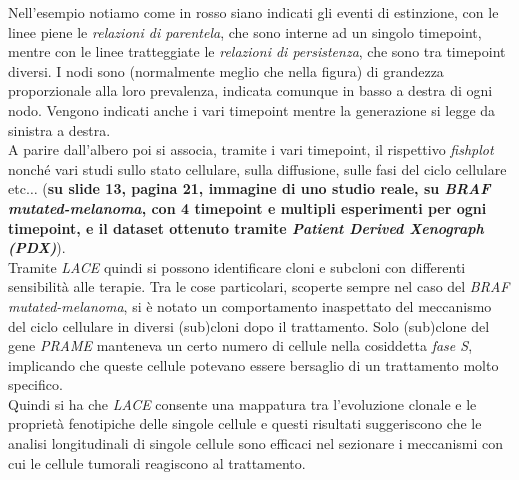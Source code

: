 \documentclass[a4paper,12pt, oneside]{book}
\begin{document}
Nell'esempio notiamo come in rosso siano indicati gli eventi di estinzione, con
le linee piene le \textit{relazioni di parentela}, che sono interne ad un
singolo timepoint, mentre con le linee
tratteggiate le \textit{relazioni di persistenza}, che sono tra timepoint
diversi. I nodi sono (normalmente 
meglio che nella figura) di grandezza proporzionale alla loro prevalenza,
indicata comunque in basso a destra di ogni nodo. Vengono indicati anche i vari
timepoint mentre la generazione si legge da sinistra a destra.\\
A parire dall'albero poi si associa, tramite i vari timepoint, il rispettivo
\textit{fishplot} nonché vari studi sullo stato cellulare, sulla diffusione,
sulle fasi del ciclo cellulare etc$\ldots$ (\textbf{su slide 13, pagina 21,
  immagine di uno studio reale, su \textit{BRAF mutated-melanoma}, con 4
  timepoint e multipli esperimenti per ogni timepoint, e il dataset ottenuto
  tramite \emph{Patient Derived Xenograph (\textit{PDX})}}). \\ 
Tramite \textit{LACE} quindi si possono identificare cloni e subcloni con
differenti sensibilità alle terapie. Tra le cose particolari, scoperte sempre
nel caso del \textit{BRAF mutated-melanoma}, si è notato un comportamento
inaspettato del meccanismo del ciclo cellulare in diversi (sub)cloni dopo il
trattamento. Solo (sub)clone del gene \textit{PRAME} manteneva un certo numero
di cellule nella cosiddetta \textit{fase S}, implicando che queste cellule
potevano essere bersaglio di un trattamento molto specifico.\\
Quindi si ha che \textit{LACE} consente una mappatura tra l'evoluzione clonale e
le proprietà fenotipiche delle singole cellule e questi risultati suggeriscono
che le analisi longitudinali di singole cellule sono efficaci nel sezionare i
meccanismi con cui le cellule tumorali reagiscono al trattamento. 
\end{document}
